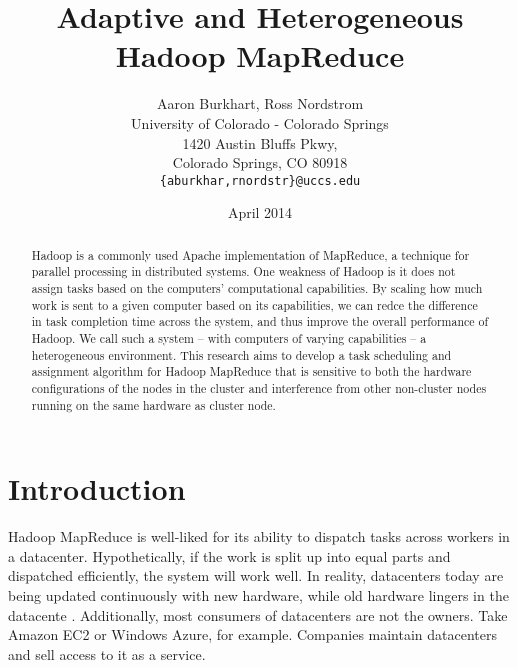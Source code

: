 \documentclass{sig-alternate}
\begin{document}
\title{Adaptive and Heterogeneous Hadoop MapReduce}
\author{Aaron Burkhart, Ross Nordstrom\\
        University of Colorado - Colorado Springs\\
        1420 Austin Bluffs Pkwy,\\
        Colorado Springs, CO 80918\\
        \texttt{\{aburkhar,rnordstr\}@uccs.edu}
       }
\date{April 2014}

\maketitle

\begin{abstract}
Hadoop is a commonly used Apache implementation of MapReduce, a technique for
parallel processing in distributed systems. One weakness of Hadoop is it does
not assign tasks based on the computers’ computational capabilities. By scaling
how much work is sent to a given computer based on its capabilities, we can
redce the difference in task completion time across the system, and thus improve
the overall performance of Hadoop. We call such a system – with computers of
varying capabilities – a heterogeneous environment. This research aims to develop
a task scheduling and assignment algorithm for Hadoop MapReduce that is sensitive 
to both the hardware configurations of the nodes in the cluster and interference
from other non-cluster nodes running on the same hardware as cluster node.
\end{abstract}


\section{Introduction}
Hadoop MapReduce is well-liked for its ability to dispatch tasks across workers
in a datacenter. Hypothetically, if the work is split up into equal parts and dispatched
efficiently, the system will work well. In reality, datacenters today are being
updated continuously with new hardware, while old hardware lingers in the datacente
. Additionally, most consumers of datacenters are not the owners. Take Amazon EC2
or Windows Azure, for example. Companies maintain datacenters and sell access to
it as a service. 
\end{document}
